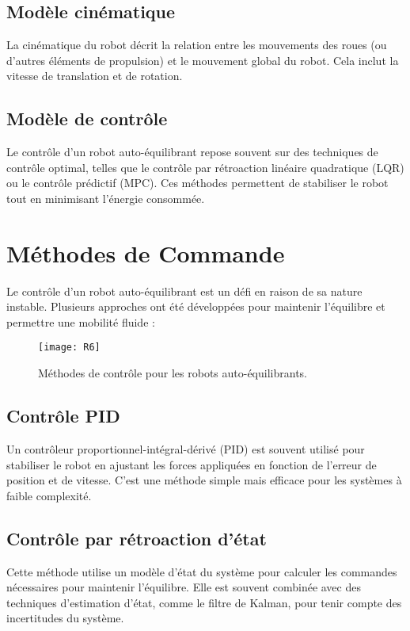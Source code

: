 \documentclass{report}
\begin{document}
\subsection*{Modèle cinématique}
La cinématique du robot décrit la relation entre les mouvements des roues (ou d'autres éléments de propulsion) et le mouvement global du robot. Cela inclut la vitesse de translation et de rotation.

\subsection*{Modèle de contrôle}
Le contrôle d'un robot auto-équilibrant repose souvent sur des techniques de contrôle optimal, telles que le contrôle par rétroaction linéaire quadratique (LQR) ou le contrôle prédictif (MPC). Ces méthodes permettent de stabiliser le robot tout en minimisant l'énergie consommée.
\vspace{15cm}
\section{ Méthodes de Commande}

Le contrôle d'un robot auto-équilibrant est un défi en raison de sa nature instable. Plusieurs approches ont été développées pour maintenir l'équilibre et permettre une mobilité fluide :

\begin{figure}[h]
    \centering
    \texttt{[image: R6]} %
    \caption{Méthodes de contrôle pour les robots auto-équilibrants.}
\end{figure}
\vspace{10cm}
\subsection*{Contrôle PID}
Un contrôleur proportionnel-intégral-dérivé (PID) est souvent utilisé pour stabiliser le robot en ajustant les forces appliquées en fonction de l'erreur de position et de vitesse. C'est une méthode simple mais efficace pour les systèmes à faible complexité.

\subsection*{Contrôle par rétroaction d'état}
Cette méthode utilise un modèle d'état du système pour calculer les commandes nécessaires pour maintenir l'équilibre. Elle est souvent combinée avec des techniques d'estimation d'état, comme le filtre de Kalman, pour tenir compte des incertitudes du système.
\end{document}
